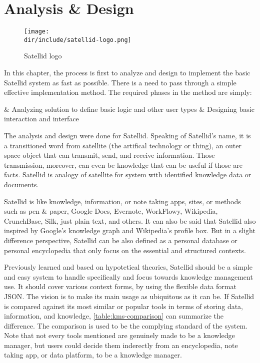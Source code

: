 \chapter{Analysis \& Design}
\label{chap:analysis-design}

\begin{figure}[ht]
  \centering
  \texttt{[image: \\dir/include/satellid-logo.png]}
  \caption{Satellid logo}
  \label{fig:satellid-logo}
\end{figure}

In this chapter, the process is first to analyze and design to implement the basic Satellid system as fast as possible.
There is a need to pass through a simple effective implementation method.
The required phases in the method are simply:

\begin{easylist}
& Analyzing solution to define basic logic and other user types
& Designing basic interaction and interface
\end{easylist}

The analysis and design were done for Satellid.
Speaking of Satellid's name, it is a transitioned word from satellite (the artifical technology or thing), an outer space object that can transmit, send, and receive information.
Those transmission, moreover, can even be knowledge that can be useful if those are facts.
Satellid is analogy of satellite for system with identified knowledge data or documents.

Satellid is like knowledge, information, or note taking apps, sites, or methods such as pen \& paper, Google Docs, Evernote, WorkFlowy, Wikipedia, CrunchBase, Silk, just plain text, and others.
It can also be said that Satellid also inspired by Google's knowledge graph and Wikipedia's profile box.
But in a slight difference perspective, Satellid can be also defined as a personal database or personal encyclopedia that only focus on the essential and structured contexts.

Previously learned and based on hypotetical theories, Satellid should be a simple and easy system to handle specifically and focus towards knowledge management use.
It should cover various context forms, by using the flexible data format \ac{JSON}.
The vision is to make its main usage as ubiquitous as it can be.
If Satellid is compared against its most similar or popular tools in terms of storing data, information, and knowledge, \autoref{table:kms-comparison} can summarize the difference.
The comparison is used to be the complying standard of the system.
Note that not every tools mentioned are genuinely made to be a knowledge manager, but users could decide them inderectly from an encyclopedia, note taking app, or data platform, to be a knowledge manager.

